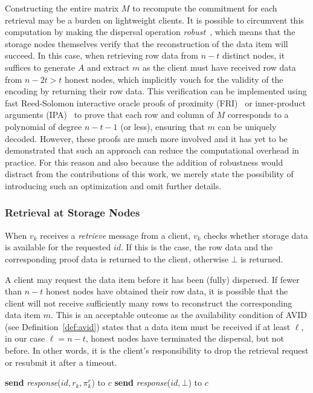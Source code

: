 \documentclass[sigconf,screen]{acmart}
\begin{document}
Constructing the entire matrix $M$ to recompute the commitment for each retrieval may be a burden on lightweight clients. It is possible to circumvent this computation by making the dispersal operation \emph{robust}~\cite{alhaddad2024}, which means that the storage nodes themselves verify that the reconstruction of the data item will succeed. In this case, when retrieving row data from $n-t$ distinct nodes, it suffices to generate $A$ and extract $m$ as the client must have received row data from $n-2t > t$ honest nodes, which implicitly vouch for the validity of the encoding by returning their row data.
This verification can be implemented using fast Reed-Solomon interactive oracle proofs of proximity (FRI)~\cite{ben2018} or inner-product arguments (IPA)~\cite{bootle2016,bunz2018} to prove that each row and column of $M$ corresponds to a polynomial of degree $n-t-1$ (or less), ensuring that $m$ can be uniquely decoded. 
However, these proofs are much more involved and it has yet to be demonstrated that such an approach can reduce the computational overhead in practice. For this reason and also because the addition of robustness would distract from the contributions of this work, we merely state the possibility of introducing such an optimization and omit further details.

\subsubsection{Retrieval at Storage Nodes}

When $v_k$ receives a \emph{retrieve} message from a client, $v_k$
checks whether storage data is available for the requested $id$.
If this is the case, the row data and the corresponding proof data is returned to the client, otherwise $\bot$ is returned.

A client may request the data item before it has been (fully) dispersed. If fewer than $n-t$ honest nodes have obtained their row data, it is possible that the client will not receive sufficiently many rows to reconstruct the corresponding data item $m$.
This is an acceptable outcome as the availability condition of AVID (see Definition~\ref{def:avid}) states that a data item must be received if at least $\ell$, in our case $\ell = n-t$, honest nodes have terminated the dispersal, but not before.
In other words, it is the client's responsibility to drop the retrieval request or resubmit it after a timeout.

\begin{algorithm}[t]
\begin{algorithmic}[1]
\small
\caption{Retrieval at node $v_k$ from client $c$ for identifier $id$.}
    \label{algo:retrieve}
\State \textbf{send} \emph{response}($id, r_k, \pi^r_k$) to $c$
\Else
\State \textbf{send} \emph{response}($id,\bot$) to $c$
\EndIf
\end{algorithmic}
\end{algorithm}
\end{document}
